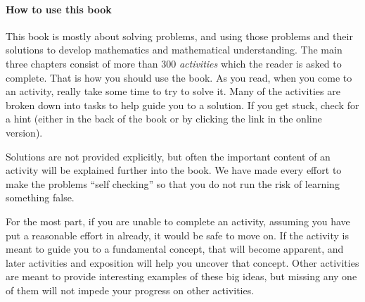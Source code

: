 \documentclass[10pt,]{book}
\theoremstyle{plain}
\theoremstyle{definition}
\theoremstyle{definition}
\theoremstyle{definition}
\numberwithin{equation}{chapter}
\begin{document}
\paragraph[{How to use this book}]{How to use this book}\hypertarget{paragraphs-1}{}
\hypertarget{p-9}{}%
This book is mostly about solving problems, and using those problems and their solutions to develop mathematics and mathematical understanding.  The main three chapters consist of more than 300 \emph{activities} which the reader is asked to complete.  That is how you should use the book.  As you read, when you come to an activity, really take some time to try to solve it.  Many of the activities are broken down into tasks to help guide you to a solution.  If you get stuck, check for a hint (either in the back of the book or by clicking the link in the online version).%
\par
\hypertarget{p-10}{}%
Solutions are not provided explicitly, but often the important content of an activity will be explained further into the book.  We have made every effort to make the problems ``self checking'' so that you do not run the risk of learning something false.%
\par
\hypertarget{p-11}{}%
For the most part, if you are unable to complete an activity, assuming you have put a reasonable effort in already, it would be safe to move on.  If the activity is meant to guide you to a fundamental concept, that will become apparent, and later activities and exposition will help you uncover that concept.  Other activities are meant to provide interesting examples of these big ideas, but missing any one of them will not impede your progress on other activities.%
\setcounter{tocdepth}{2}
\renewcommand*\contentsname{Contents}
\tableofcontents
\mainmatter
\typeout{************************************************}
\typeout{************************************************}
\end{document}
